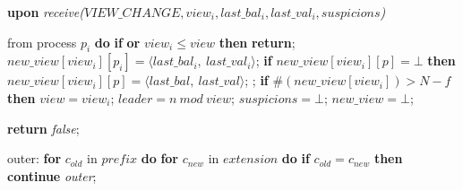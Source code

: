 \begin{algorithm}
\begin{algorithmic}[1]
		\State\textbf{upon} \textit{receive($VIEW\_CHANGE, view_i, last\_bal_i, last\_val_i, suspicions$)} 
		\item[] from process $p_i$ \textbf{do} 
		\State\hspace{\algorithmicindent} \textbf{if}  \textbf{or} $view_i \leq view$ \textbf{then}
		\State\hspace{\algorithmicindent}\hspace{\algorithmicindent}\textbf{return};
		\State
		\State\hspace{\algorithmicindent} $new\_view[view_i][p_i] = \langle last\_bal_i,\ last\_val_i \rangle$;
		\State\hspace{\algorithmicindent} \textbf{if} $new\_view[view_i][p] = \bot$ \textbf{then}
		\State\hspace{\algorithmicindent}\hspace{\algorithmicindent} $new\_view[view_i][p] = \langle last\_bal,\ last\_val \rangle$;
		\State\hspace{\algorithmicindent}\hspace{\algorithmicindent}  ;
		\State
		\State\hspace{\algorithmicindent} \textbf{if} $\#(new\_view[view_i]) > N-f$ \textbf{then}
		\State\hspace{\algorithmicindent}\hspace{\algorithmicindent} $view = view_i$;
		\State\hspace{\algorithmicindent}\hspace{\algorithmicindent} $leader = n\ mod\ view$;
		\State\hspace{\algorithmicindent}\hspace{\algorithmicindent} $suspicions = \bot$;
		\State\hspace{\algorithmicindent}\hspace{\algorithmicindent} $new\_view = \bot$;

		
		\iffalse\State
		\State \textbf{return} \textit{false};
		\EndIf
		
		\State
		\item[] outer:	
		\State \textbf{for} $c_{old}$ in $prefix$ \textbf{do}
		\State \hspace{\algorithmicindent} \textbf{for} $c_{new}$ in $extension$ \textbf{do}
		\State\hspace{\algorithmicindent}\hspace{\algorithmicindent} \textbf{if} $c_{old} = c_{new}$ \textbf{then}
		\State \hspace{\algorithmicindent}\hspace{\algorithmicindent}\hspace{\algorithmicindent} \textbf{continue} \textit{outer};
		

\end{algorithmic}
\end{algorithm}
